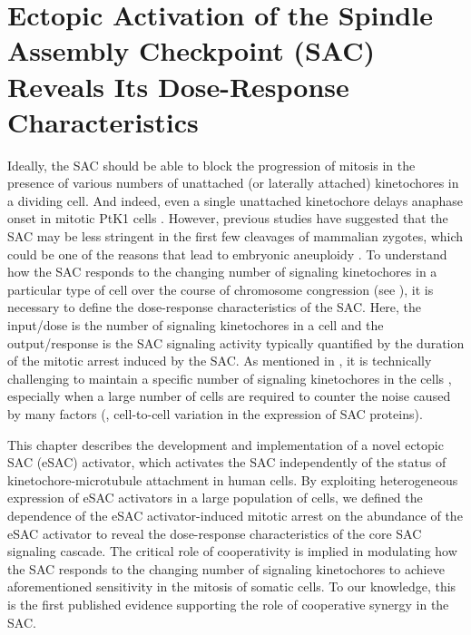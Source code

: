\chapter{Ectopic Activation of the Spindle Assembly Checkpoint (SAC) Reveals Its Dose-Response Characteristics}
\label{chpt:2}

Ideally, the SAC should be able to block the progression of mitosis in the presence of various numbers of unattached (or laterally attached) kinetochores in a dividing cell. And indeed, even a single unattached kinetochore delays anaphase onset in mitotic PtK1 cells \cite{PtK1SingleUnattachedKT}. However, previous studies have suggested that the SAC may be less stringent in the first few cleavages of mammalian zygotes, which could be one of the reasons that lead to embryonic aneuploidy \cite{MouseEmbryoSAC, ParentalGenomeUnification, MammalianInitialCleavages}. To understand how the SAC responds to the changing number of signaling kinetochores in a particular type of cell over the course of chromosome congression (see ), it is necessary to define the dose-response characteristics of the SAC. Here, the input/dose is the number of signaling kinetochores in a cell and the output/response is the SAC signaling activity typically quantified by the duration of the mitotic arrest induced by the SAC. As mentioned in , it is technically challenging to maintain a specific number of signaling kinetochores in the cells \cite{Ablation}, especially when a large number of cells are required to counter the noise caused by many factors (, cell-to-cell variation in the expression of SAC proteins).

This chapter describes the development and implementation of a novel ectopic SAC (eSAC) activator, which activates the SAC independently of the status of kinetochore-microtubule attachment in human cells. By exploiting heterogeneous expression of eSAC activators in a large population of cells, we defined the dependence of the eSAC activator-induced mitotic arrest on the abundance of the eSAC activator to reveal the dose-response characteristics of the core SAC signaling cascade. The critical role of cooperativity is implied in modulating how the SAC responds to the changing number of signaling kinetochores to achieve aforementioned sensitivity in the mitosis of somatic cells. To our knowledge, this is the first published evidence supporting the role of cooperative synergy in the SAC.

